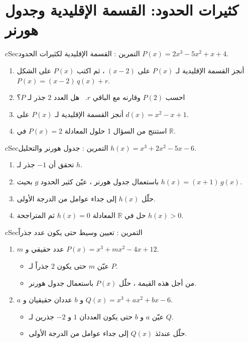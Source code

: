\documentclass[12pt,a4paper]{article}
\newenvironment{BOX}[2]{\begin{otherlanguage}{english}\begin{arbox}{#1}{#2}}{\end{arbox}\end{otherlanguage}}
\newcounter{exo}
\newenvironment{tamrin}[1]{\stepcounter{exo}\begin{BOX}{cSec}{التمرين \theexo: #1}}{\end{BOX}}
\newcommand{\R}{\mathbb{R}}
\begin{document}
\section{كثيرات الحدود: القسمة الإقليدية وجدول هورنر}
\begin{tamrin}{القسمة الإقليدية لكثيرات الحدود}
$P(x)=2x^3-5x^2+x+4$.
\begin{enumerate}
\item أنجز القسمة الإقليدية لـ $P(x)$ على $(x-2)$ ، ثم اكتب $P(x)$ على الشكل $P(x)=(x-2)\,q(x)+r$.
\item احسب $P(2)$ وقارنه مع الباقي $r$. \ هل العدد $2$ جذر لـ $P$؟
\item أنجز القسمة الإقليدية لـ $P(x)$ على $d(x)=x^2-x+1$.
\item استنتج من السؤال 1 حلول المعادلة $P(x)=2$ في $\R$.
\end{enumerate}
\end{tamrin}

\begin{tamrin}{جدول هورنر والتحليل}
$h(x)=x^3+2x^2-5x-6$.
\begin{enumerate}
\item تحقق أن $-1$ جذر لـ $h$.
\item باستعمال جدول هورنر ، عيّن كثير الحدود $g$ بحيث $h(x)=(x+1)\,g(x)$.
\item حلّل $h(x)$ إلى جداء عوامل من الدرجة الأولى.
\item حل في $\R$ المعادلة $h(x)=0$ ثم المتراجحة $h(x)>0$.
\end{enumerate}
\end{tamrin}

\begin{tamrin}{تعيين وسيط حتى يكون عدد جذراً}
\begin{enumerate}
\item $m$ عدد حقيقي و $P(x)=x^3+mx^2-4x+12$.
\begin{itemize}
\item[(أ)] عيّن $m$ حتى يكون $2$ جذراً لـ $P$.
\item[(ب)] من أجل هذه القيمة ، حلّل $P(x)$ باستعمال جدول هورنر.
\end{itemize}
\item $a$ و $b$ عددان حقيقيان و $Q(x)=x^3+ax^2+bx-6$.
\begin{itemize}
\item[(أ)] عيّن $a$ و $b$ حتى يكون العددان $1$ و $-2$ جذرين لـ $Q$.
\item[(ب)] حلّل عندئذ $Q(x)$ إلى جداء عوامل من الدرجة الأولى.
\end{itemize}
\end{enumerate}
\end{tamrin}
\end{document}
